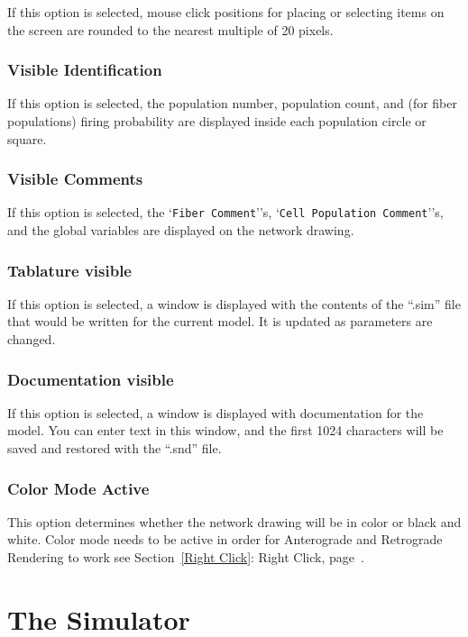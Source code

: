 \documentclass[12pt,openany,oneside]{book}
\newcommand{\tisamp}[1]{`\texttt{#1}'}
\newcommand{\tixref}[1]{see Section~\ref{#1}: #1, page~\pageref{#1}}
\begin{document}
If this option is selected, mouse click positions for placing or selecting
items on the screen are rounded to the nearest multiple of 20 pixels.

\subsubsection*{Visible Identification}

If this option is selected, the population number, population count,
and (for fiber populations) firing probability are displayed inside
each population circle or square.

\subsubsection*{Visible Comments}

If this option is selected, the \tisamp{Fiber Comment}'s, \tisamp{Cell
Population Comment}'s, and the global variables are displayed on the
network drawing.

\subsubsection*{Tablature visible}

If this option is selected, a window is displayed with the contents of
the ``.sim'' file that would be written for the current model.  It is
updated as parameters are changed.

\subsubsection*{Documentation visible}

If this option is selected, a window is displayed with documentation
for the model.  You can enter text in this window, and the first 1024
characters will be saved and restored with the ``.snd'' file.

\subsubsection*{Color Mode Active}

This option determines whether the network drawing will be in color or
black and white.  Color mode needs to be active in order for
Anterograde and Retrograde Rendering to work \tixref{Right Click}.

\section{The Simulator}
\end{document}
